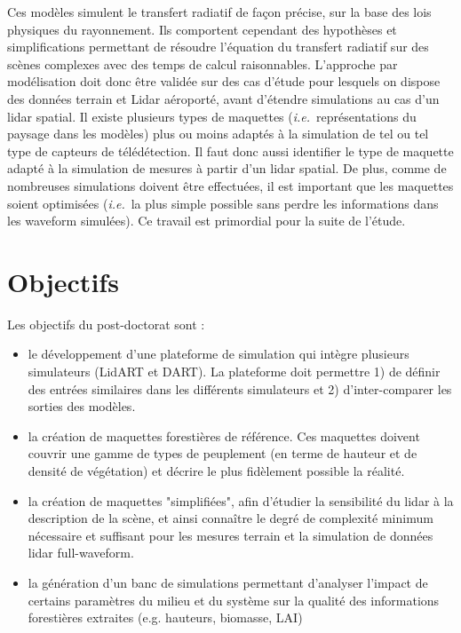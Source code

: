 \documentclass[a4paper,11pt]{article}
\newcommand{\ie}{\textit{i.e.}~}
\begin{document}
Ces modèles simulent le transfert radiatif de façon précise, sur la base des lois physiques du rayonnement. Ils comportent cependant des hypothèses et simplifications permettant de résoudre l'équation du transfert radiatif sur des scènes complexes avec des temps de calcul raisonnables. L'approche par modélisation doit donc être validée sur des cas d'étude pour lesquels on dispose des données terrain et Lidar aéroporté, avant d'étendre simulations au cas d'un lidar spatial. Il existe plusieurs types de maquettes (\ie représentations du paysage dans les modèles) plus ou moins adaptés à la simulation de tel ou tel type de capteurs de télédétection. Il faut donc aussi identifier le type de maquette adapté à la simulation de mesures à partir d'un lidar spatial. De plus, comme de nombreuses simulations doivent être effectuées, il est important que les maquettes soient optimisées (\ie la plus simple possible sans perdre les informations dans les waveform simulées). Ce travail est primordial pour la suite de l'étude.



\section{Objectifs}
Les objectifs du post-doctorat sont :
\begin{itemize}
\item le développement d'une plateforme de simulation qui intègre plusieurs simulateurs (LidART et DART). La plateforme doit permettre 1) de définir des entrées similaires dans les différents simulateurs et 2) d’inter-comparer les sorties des modèles.

\item la création de maquettes forestières de référence. Ces maquettes doivent couvrir une gamme de types de peuplement (en terme de hauteur et de densité de végétation) et décrire le plus fidèlement possible la réalité.

\item la création de maquettes "simplifiées", afin d'étudier la sensibilité du lidar à la description de la scène, et ainsi connaître le degré de complexité minimum nécessaire et suffisant pour les mesures terrain et la simulation de données lidar full-waveform.

\item la génération d'un banc de simulations permettant d'analyser l'impact de certains paramètres du milieu et du système sur la qualité des informations forestières extraites (e.g. hauteurs, biomasse, LAI)

\end{itemize}
\end{document}

